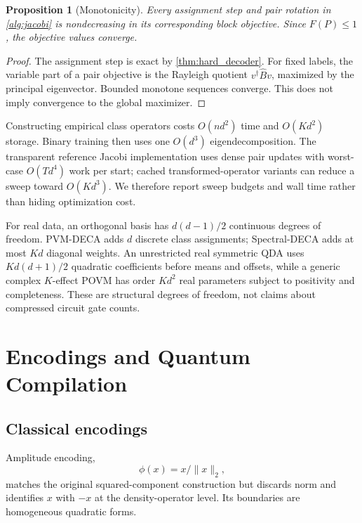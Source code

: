 \documentclass[10pt,twocolumn]{article}
\newtheorem{proposition}[theorem]{Proposition}
\theoremstyle{definition}
\theoremstyle{remark}
\begin{document}
\begin{proposition}[Monotonicity]
\label{prop:monotonic}
Every assignment step and pair rotation in \cref{alg:jacobi} is
nondecreasing in its corresponding block objective.  Since $F(P)\le1$, the
objective values converge.
\end{proposition}
\begin{proof}
The assignment step is exact by \cref{thm:hard_decoder}.  For fixed labels,
the variable part of a pair objective is the Rayleigh quotient
$v^\dagger\widehat Bv$, maximized by the principal eigenvector.  Bounded
monotone sequences converge.  This does not imply convergence to the global
maximizer.
\end{proof}

Constructing empirical class operators costs $O(nd^2)$ time and
$O(Kd^2)$ storage.  Binary training then uses one $O(d^3)$ eigendecomposition.
The transparent reference Jacobi implementation uses dense pair updates with
worst-case $O(Td^4)$ work per start; cached transformed-operator variants can
reduce a sweep toward $O(Kd^3)$.  We therefore report sweep budgets and wall
time rather than hiding optimization cost.

For real data, an orthogonal basis has $d(d-1)/2$ continuous degrees of
freedom.  PVM-DECA adds $d$ discrete class assignments; Spectral-DECA adds at
most $Kd$ diagonal weights.  An unrestricted real symmetric QDA uses
$K d(d+1)/2$ quadratic coefficients before means and offsets, while a generic
complex $K$-effect POVM has order $Kd^2$ real parameters subject to positivity
and completeness.  These are structural degrees of freedom, not claims about
compressed circuit gate counts.

\section{Encodings and Quantum Compilation}
\label{sec:quantum}

\subsection{Classical encodings}

Amplitude encoding,
\begin{equation}
\phi(x)=x/\|x\|_2,
\end{equation}
matches the original squared-component construction but discards norm and
identifies $x$ with $-x$ at the density-operator level.  Its boundaries are
homogeneous quadratic forms.
\end{document}
